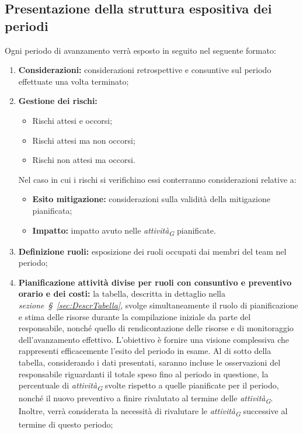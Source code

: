\subsection{Presentazione della struttura espositiva dei periodi}
Ogni periodo di avanzamento verrà esposto in seguito nel seguente formato:
\begin{enumerate}
    \item \textbf{Considerazioni:} considerazioni retrospettive e consuntive sul periodo effettuate una volta terminato;

    \pagebreak
    
    \item \textbf{Gestione dei rischi:}
            \begin{itemize}
                \item Rischi attesi e occorsi;
                \item Rischi attesi ma non occorsi;
                \item Rischi non attesi ma occorsi.
            \end{itemize}
        Nel caso in cui i rischi si verifichino essi conterranno considerazioni relative a:
        \begin{itemize}
            \item \textbf{Esito mitigazione:} considerazioni sulla validità della mitigazione pianificata;
            \item \textbf{Impatto:} impatto avuto nelle \textit{attività}\textsubscript{\textit{G}} pianificate.
        \end{itemize}
    \item \textbf{Definizione ruoli:} esposizione dei ruoli occupati dai membri del team nel periodo;
    \item \textbf{Pianificazione attività divise per ruoli con consuntivo e preventivo orario e dei costi:}
    la tabella, descritta in dettaglio nella \textit{sezione~\S~\ref{sec:DescrTabella}}, svolge simultaneamente il ruolo di pianificazione e stima delle risorse durante la compilazione iniziale da parte del responsabile, nonché quello di rendicontazione delle risorse e di monitoraggio dell'avanzamento effettivo. L'obiettivo è fornire una visione complessiva che rappresenti efficacemente l'esito del periodo in esame.
    Al di sotto della tabella, considerando i dati presentati, saranno incluse le osservazioni del responsabile riguardanti il totale speso fino al periodo in questione, la percentuale di \textit{attività}\textsubscript{\textit{G}} svolte rispetto a quelle pianificate per il periodo, nonché il nuovo preventivo a finire rivalutato al termine delle \textit{attività}\textsubscript{\textit{G}}. Inoltre, verrà considerata la necessità di rivalutare le \textit{attività}\textsubscript{\textit{G}} successive al termine di questo periodo;

\end{enumerate}
